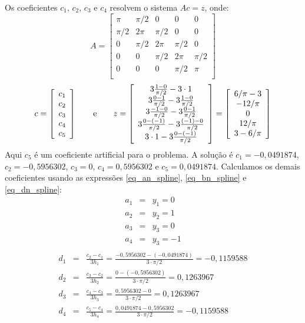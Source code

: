 Os coeficientes $c_1$, $c_2$, $c_3$ e $c_4$ resolvem o sistema $Ac = z$, onde:
\begin{equation*}
A=\left[\begin{array}{ccccc}
\pi &\pi/2&0&0&0 \\
\pi/2&2\pi&\pi/2&0&0\\
0&\pi/2&2\pi&\pi/2&0\\
0&0&\pi/2&2\pi&\pi/2\\
0&0&0&\pi/2&\pi\\
\end{array}\right]  
\end{equation*}
\begin{equation*}
c = \left[\begin{array}{c}
c_1\\
c_2\\
c_3\\
c_4\\
c_5
\end{array}\right]\qquad \hbox{e}\qquad
z = \left[\begin{array}{c}
3\frac{1-0}{\pi/2}-3\cdot 1\\
3\frac{0-1}{\pi/2}-3\frac{1-0}{\pi/2}\\
3\frac{-1-0}{\pi/2}-3\frac{0-1}{\pi/2}\\
3\frac{0-(-1)}{\pi/2}-3\frac{(-1)-0}{\pi/2}\\
3\cdot 1-3\frac{0-(-1)}{\pi/2}
\end{array}\right]=\left[\begin{array}{c}
6/\pi-3\\
-12/\pi\\
0\\
12/\pi\\
3-6/\pi
\end{array}\right]  
\end{equation*}
Aqui $c_5$ é um coeficiente artificial para o problema. A solução é  $c_1=-0,0491874$, $c_2=-0,5956302$, $c_3=0$, $c_4=0,5956302$ e $c_5=0,0491874$. Calculamos os demais coeficientes usando as expressões \eqref{eq_an_spline}, \eqref{eq_bn_spline} e \eqref{eq_dn_spline}:
\begin{eqnarray*}
a_1&=&y_1=0\\
a_2&=&y_2=1\\
a_3&=&y_3=0\\
a_4&=&y_3=-1\\
\end{eqnarray*}
\begin{eqnarray*}
d_1&=&\frac{c_{2}-c_1}{3h_1}=\frac{-0,5956302-(-0,0491874)}{3\cdot \pi/2}=-0,1159588\\
d_2&=&\frac{c_{3}-c_2}{3h_2}=\frac{0-(-0,5956302)}{3\cdot \pi/2}=0,1263967\\
d_3&=&\frac{c_{4}-c_3}{3h_3}=\frac{0,5956302- 0}{3\cdot \pi/2}=0,1263967\\
d_4&=&\frac{c_{5}-c_4}{3h_4}=\frac{0,0491874- 0,5956302}{3\cdot \pi/2}=-0,1159588
\end{eqnarray*}
